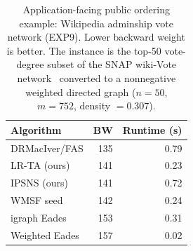\begin{table}[t]
\centering\small
\caption{Application-facing public ordering example: Wikipedia adminship vote network (EXP9).
Lower backward weight is better.
The instance is the top-50 vote-degree subset of the SNAP wiki-Vote
network~\cite{LHK10WikiVote} converted to a nonnegative weighted directed
graph ($n{=}50$, $m{=}752$, density $= 0.307$).}
\label{tab:application-case}
\begin{tabular}{lrr}
\toprule
Algorithm & BW & Runtime (s) \\
\midrule
DRMacIver/FAS & 135 & 0.79 \\
LR-TA (ours)  & 141 & 0.23 \\
IPSNS (ours)  & 141 & 0.72 \\
WMSF seed     & 142 & 0.24 \\
igraph Eades  & 153 & 0.31 \\
Weighted Eades & 157 & 0.02 \\
\bottomrule
\end{tabular}
\end{table}
